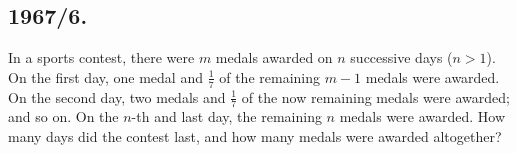 \documentclass{article}
\begin{document}
\subsection*{1967/6.}
In a sports contest, there were $m$ medals awarded on $n$ successive days ($n > 1$). On the first day, one medal and $\frac{1}{7}$ of the remaining $m - 1$ medals were awarded. On the second day, two medals and $\frac{1}{7}$ of the now remaining medals were awarded; and so on. On the $n$-th and last day, the remaining $n$ medals were awarded. How many days did the contest last, and how many medals were awarded altogether?
\end{document}
